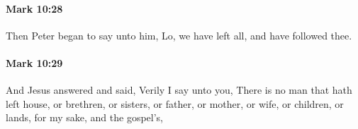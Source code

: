 		\paragraph{Mark 10:28} %
			\label{MARK-10-28}

			Then Peter began to say unto him, Lo, we have left all, and have followed thee.

			\begin{framed}
			\scriptsize
				\begin{compactdesc}
					\item[SBLG] 
				\end{compactdesc}
			\end{framed}

		\paragraph{Mark 10:29} %
			\label{MARK-10-29}

			And Jesus answered and said, Verily I say unto you, There is no man that hath left house, or brethren, or sisters, or father, or mother, or wife, or children, or lands, for my sake, and the gospel's,

